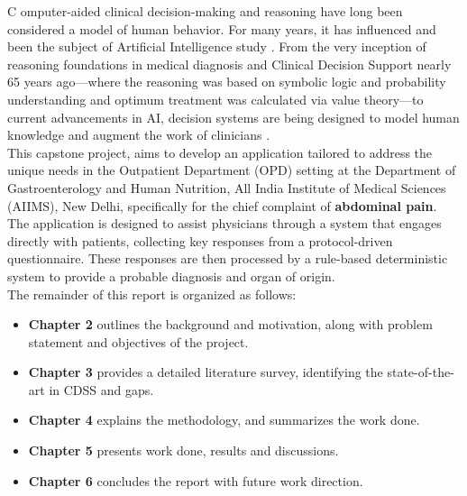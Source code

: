\lettrine{C}{ }omputer-aided clinical decision-making and reasoning have long been considered a model of human behavior. For many years, it has influenced and been the subject of Artificial Intelligence study \cite{cohen2022introducing}. From the very inception of reasoning foundations in medical diagnosis and Clinical Decision Support nearly 65 years ago---where the reasoning was based on symbolic logic and probability understanding and optimum treatment was calculated via value theory---to current advancements in AI, decision systems are being designed to model human knowledge and augment the work of clinicians \cite{ledley1959reasoning, rajkomar2019machine}.\\

\noindent This capstone project, aims to develop an application tailored to address the unique needs in the Outpatient Department (OPD) setting at the Department of Gastroenterology and Human Nutrition, All India Institute of Medical Sciences (AIIMS), New Delhi, specifically for the chief complaint of \textcolor{TUMRed}{\textbf{abdominal pain}}. The application is designed to assist physicians through a system that engages directly with patients, collecting key responses from a protocol-driven questionnaire. These responses are then processed by a rule-based deterministic system to provide a probable diagnosis and organ of origin.\\

\noindent The remainder of this report is organized as follows:
\begin{itemize}
    \item \textcolor{TUMRed}{\textbf{Chapter 2}} outlines the background and motivation, along with problem statement and objectives of the project.
    \item \textcolor{TUMRed}{\textbf{Chapter 3}} provides a detailed literature survey, identifying the state-of-the-art in CDSS and gaps.
    \item \textcolor{TUMRed}{\textbf{Chapter 4}} explains the methodology, and summarizes the work done.
    \item \textcolor{TUMRed}{\textbf{Chapter 5}} presents work done, results and discussions.
    \item \textcolor{TUMRed}{\textbf{Chapter 6}} concludes the report with future work direction.
\end{itemize}